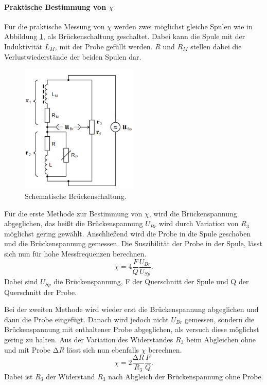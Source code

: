 \paragraph{Praktische Bestimmung von $\chi$}
Für die praktische Messung von $\chi$ werden zwei möglichst gleiche Spulen wie in Abbildung \ref{fig:1}, als Brückenschaltung 
geschaltet. Dabei kann die Spule mit der Induktivität $L_M$, mit der Probe gefüllt werden. $R$ und $R_M$ stellen dabei die Verlustwiederstände der 
beiden Spulen dar.
\begin{figure}
    \centering
    \includegraphics[width = 0.50\textwidth]{V606Bild1.png}
    \caption{Schematische Brückenschaltung.}
    \label{fig:1}
\end{figure}
Für die erste Methode zur Bestimmung von $\chi$, wird die Brückenspannung abgeglichen, das heißt die Brückenspannung $U_{Br}$ wird durch Variation von $R_3$ möglichst gering gewählt.
Anschließend wird die Probe in die Spule geschoben und die Brückenspannung gemessen.
Die Suszibilität der Probe in der Spule, lässt sich nun für hohe Messfrequenzen berechnen.
\begin{equation}
    \label{equ:8}
    \chi = 4 \frac{F}{Q} \frac{U_{Br}}{U_{Sp}}.
\end{equation}
Dabei sind $U_{Sp}$ die Brückenspannung, F der Querschnitt der Spule und Q der Querschnitt der Probe.

Bei der zweiten Methode wird wieder erst die Brückenspannung abgeglichen und dann die Probe eingefügt. Danach wird jedoch nicht $U_{Br}$ gemessen, 
sondern die Brückenspannung mit enthaltener Probe abgeglichen, als versuch diese möglichst gering zu halten. 
Aus der Variation des Widerstandes $R_3$ beim Abgleichen ohne und mit Probe $\increment R$ lässt sich nun ebenfalls $\chi$ berechnen.
\begin{equation}
    \label{equ:9}
    \chi = 2 \frac{\increment R }{R_3} \frac{F}{Q}.
\end{equation}
Dabei ist $R_3$ der Widerstand $R_3$ nach Abgleich der Brückenspannung ohne Probe.

